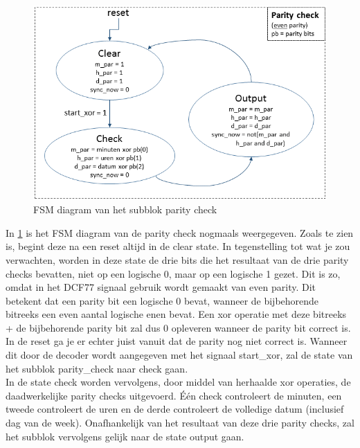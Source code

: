 \begin{figure}[h!]
\begin{center}
\includegraphics[keepaspectratio=true,scale=0.7]{Figuren/DCF77/FSM_parity_check}
\captionsetup{justification=centering}\caption{FSM diagram van het subblok parity check}
\label{fig: parity_check2}
\end{center}
\end{figure}

\noindent In \cref{fig: parity_check2} is het FSM diagram van de parity check nogmaals weergegeven. Zoals te zien is, begint deze na een reset altijd in de clear state. In tegenstelling tot wat je zou verwachten, worden in deze state de drie bits die het resultaat van de drie parity checks bevatten, niet op een logische 0, maar op een logische 1 gezet. Dit is zo, omdat in het DCF77 signaal gebruik wordt gemaakt van even parity. Dit betekent dat een parity bit een logische 0 bevat, wanneer de bijbehorende bitreeks een even aantal logische enen bevat. Een xor operatie met deze bitreeks + de bijbehorende parity bit zal dus 0 opleveren wanneer de parity bit correct is. In de reset ga je er echter juist vanuit dat de parity nog niet correct is. Wanneer dit door de decoder wordt aangegeven met het signaal start\_xor, zal de state van het subblok parity\_check naar check gaan.\\

\noindent In de state check worden vervolgens, door middel van herhaalde xor operaties, de daadwerkelijke parity checks uitgevoerd. \'E\'en check controleert de minuten, een tweede controleert de uren en de derde controleert de volledige datum (inclusief dag van de week). Onafhankelijk van het resultaat van deze drie parity checks, zal het subblok vervolgens gelijk naar de state output gaan.\\


